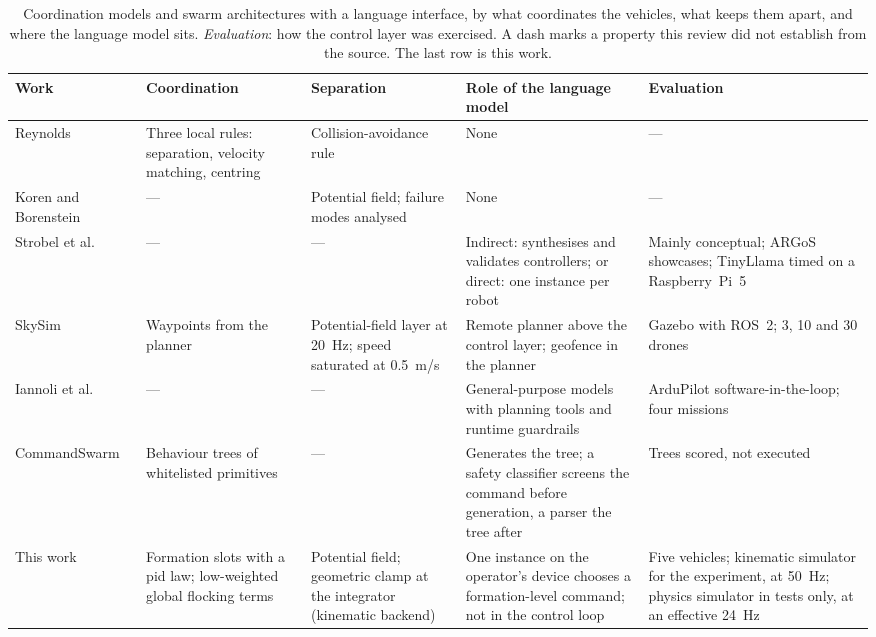 \begin{table}[htbp]
\centering
\footnotesize
\caption[Swarm control beneath a language interface]{Coordination models and swarm architectures
with a language interface, by what coordinates the vehicles, what keeps them apart, and where the
language model sits. \emph{Evaluation}: how the control layer was exercised. A dash marks a
property this review did not establish from the source. The last row is this work.}
\label{tab:soa-swarm}
\begin{tabularx}{\textwidth}{@{}>{\raggedright\arraybackslash}p{2.1cm} >{\raggedright\arraybackslash}X >{\raggedright\arraybackslash}p{2.4cm} >{\raggedright\arraybackslash}X >{\raggedright\arraybackslash}X@{}}
\toprule
Work & Coordination & Separation & Role of the language model & Evaluation \\
\midrule
Reynolds~\cite{reynolds1987} & Three local rules: separation, velocity matching, centring & Collision-avoidance rule & None & --- \\
Koren and Borenstein~\cite{koren1991} & --- & Potential field; failure modes analysed & None & --- \\
Strobel et al.~\cite{llm2swarm2024} & --- & --- & Indirect: synthesises and validates controllers; or direct: one instance per robot & Mainly conceptual; ARGoS showcases; TinyLlama timed on a Raspberry~Pi~5 \\
SkySim~\cite{skysim2026} & Waypoints from the planner & Potential-field layer at 20~Hz; speed saturated at 0.5~m/s & Remote planner above the control layer; geofence in the planner & Gazebo with ROS~2; 3, 10 and 30 drones \\
Iannoli et al.~\cite{iannoli2026} & --- & --- & General-purpose models with planning tools and runtime guardrails & ArduPilot software-in-the-loop; four missions \\
Command\-Swarm~\cite{commandswarm2026} & Behaviour trees of whitelisted primitives & --- & Generates the tree; a safety classifier screens the command before generation, a parser the tree after & Trees scored, not executed \\
\midrule
This work & Formation slots with a \gls{pid} law; low-weighted global flocking terms & Potential field; geometric clamp at the integrator (kinematic backend) & One instance on the operator's device chooses a formation-level command; not in the control loop & Five vehicles; kinematic simulator for the experiment, at 50~Hz; physics simulator in tests only, at an effective 24~Hz \\
\bottomrule
\end{tabularx}
\end{table}


